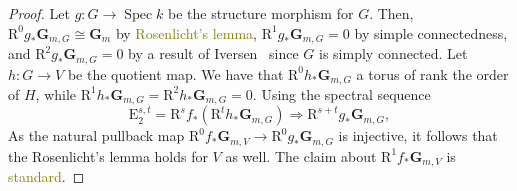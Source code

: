 \documentclass[10pt,letterpaper,twoside]{article}
\newcommand{\BA}[1]{\textcolor{olive}{#1}}
\newcommand{\E}{\mathrm{E}}
\newcommand{\R}{\mathrm{R}}
\renewcommand{\1}{\mathbf{1}}
\newcommand{\bG}{\mathbf{G}}
\newcommand{\Gm}{\bG_{m}}
\DeclareMathOperator{\Spec}{Spec}
\newcommand{\iso}{\cong}
\theoremstyle{plain}
\theoremstyle{plain}
\theoremstyle{definition}
\theoremstyle{named}
\theoremstyle{definition}
\begin{document}
	\begin{proof}
		Let $g\colon G\rightarrow\Spec k$ be the structure morphism for $G$.
		Then, $\R^0g_*\bG_{m,G}\iso\Gm$ by
		\BA{Rosenlicht's lemma}, $\R^1g_*\bG_{m,G}=0$ by simple connectedness, and $\R^2g_*\bG_{m,G}=0$
		by a result of Iversen~\cite{iversen} since $G$ is simply connected. Let $h\colon G\rightarrow
		V$ be the quotient map. We have that $\R^0h_*\bG_{m,G}$ a torus of rank the order of $H$, while
		$\R^1h_*\bG_{m,G}=\R^2h_*\bG_{m,G}=0$. 
		Using the spectral sequence $$\E_2^{s,t}=\R^s f_*(\R^t h_*\bG_{m,G})\Rightarrow\R^{s+t}
		g_*\bG_{m,G},$$
		As the natural pullback map $\R^0f_*\bG_{m,V}\rightarrow\R^0g_*\bG_{m,G}$ is
		injective, it follows that the Rosenlicht's lemma holds for $V$ as well. The claim about
		$\R^1f_*\bG_{m,V}$ is \BA{standard}.
	\end{proof}
	
	
	
	
	
	
	
	
	
	
	
	
	
	
	\small
	
	
	
\end{document}

